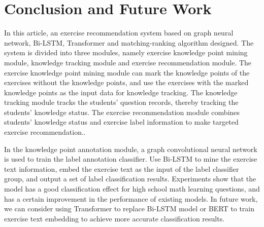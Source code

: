 \chapter{Conclusion and Future Work}


In this article, an exercise recommendation system based on graph neural network, Bi-LSTM, Transformer and matching-ranking algorithm designed. The system is divided into three modules, namely exercise knowledge point mining module, knowledge tracking module and exercise recommendation module. The exercise knowledge point mining module can mark the knowledge points of the exercises without the knowledge points, and use the exercises with the marked knowledge points as the input data for knowledge tracking. The knowledge tracking module tracks the students' question records, thereby tracking the students' knowledge status. The exercise recommendation module combines students' knowledge status and exercise label information to make targeted exercise recommendation..


In the knowledge point annotation module, a graph convolutional neural network is used to train the label annotation classifier. Use Bi-LSTM to mine the exercise text information, embed the exercise text as the input of the label classifier group, and output a set of label classification results. Experiments show that the model has a good classification effect for high school math learning questions, and has a certain improvement in the performance of existing models. In future work, we can consider using Transformer to replace Bi-LSTM model or BERT to train exercise text embedding to achieve more accurate classification results.

